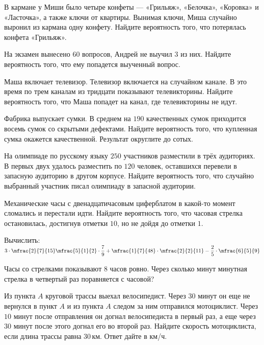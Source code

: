 \begin{class}[number=5]
	\begin{listofex}
		\item В кармане у Миши было четыре конфеты  — «Грильяж», «Белочка», «Коровка» и «Ласточка», а также ключи от квартиры. Вынимая ключи, Миша случайно выронил из кармана одну конфету. Найдите вероятность того, что потерялась конфета «Грильяж».
		\item На экзамен вынесено \( 60 \) вопросов, Андрей не выучил \( 3 \) из них. Найдите вероятность того, что ему попадется выученный вопрос.
		\item Маша включает телевизор. Телевизор включается на случайном канале. В это время по трем каналам из тридцати показывают телевикторины. Найдите вероятность того, что Маша попадет на канал, где телевикторины не идут.
		\item Фабрика выпускает сумки. В среднем на \( 190 \) качественных сумок приходится восемь сумок со скрытыми дефектами. Найдите вероятность того, что купленная сумка окажется качественной. Результат округлите до сотых.
		\item На олимпиаде по русскому языку \( 250 \) участников разместили в трёх аудиториях. В первых двух удалось разместить по \( 120 \) человек, оставшихся перевели в запасную аудиторию в другом корпусе. Найдите вероятность того, что случайно выбранный участник писал олимпиаду в запасной аудитории.
		\item Механические часы с двенадцатичасовым циферблатом в какой-то момент сломались и перестали идти. Найдите вероятность того, что часовая стрелка остановилась, достигнув отметки \( 10 \), но не дойдя до отметки \( 1 \).
		\item Вычислить: \quad \( 3\cdot\mfrac{2}{7}{15}\mfrac{5}{1}{2}\cdot\dfrac{7}{9}+\mfrac{1}{7}{48}\cdot\mfrac{2}{2}{11}-\dfrac{2}{5}\cdot\mfrac{6}{5}{9} \)
		\item Часы со стрелками показывают \( 8 \) часов ровно. Через сколько минут минутная стрелка в четвертый раз поравняется с часовой?
		\item Из пункта \( A \) круговой трассы выехал велосипедист. Через \( 30 \) минут он еще не вернулся в пункт \( A \) и из пункта \( A \) следом за ним отправился мотоциклист. Через \( 10 \) минут после отправления он догнал велосипедиста в первый раз, а еще через \( 30 \) минут после этого догнал его во второй раз. Найдите скорость мотоциклиста, если длина трассы равна \( 30 \) км. Ответ дайте в км/ч.
	\end{listofex}
\end{class}

